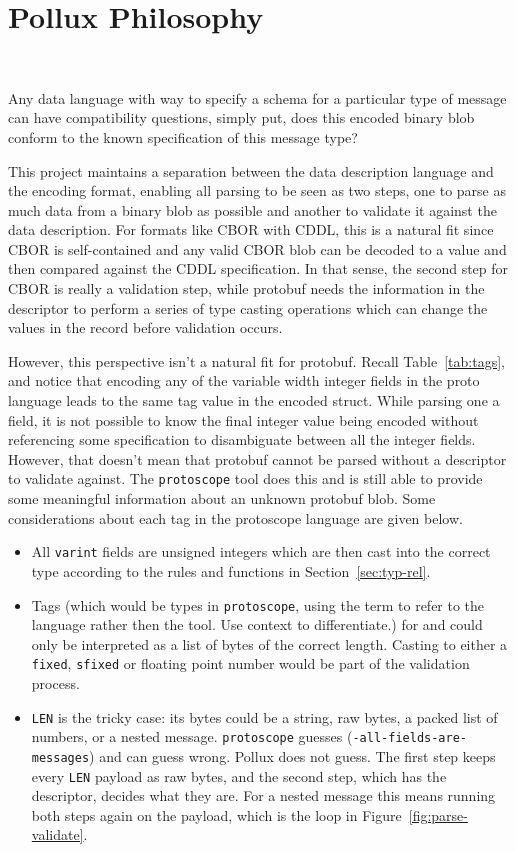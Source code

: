 \section{Pollux Philosophy}~\label{sec:philosophy}

Any data language with way to specify a schema for a particular type of message
can have compatibility questions, simply put, does this encoded binary blob
conform to the known specification of this message type?

This project maintains a separation between the data description language and
the encoding format, enabling all parsing to be seen as two steps, one to parse
as much data from a binary blob as possible and another to validate it against
the data description. For formats like CBOR with CDDL, this is a natural fit
since CBOR is self-contained and any valid CBOR blob can be decoded to a value
and then compared against the CDDL specification. In that sense, the second step
for CBOR is really a validation step, while protobuf needs the information in
the descriptor to perform a series of type casting operations which can change
the values in the record before validation occurs.

However, this perspective isn't a natural fit for protobuf. Recall
Table~\ref{tab:tags}, and notice that encoding any of the variable width integer
fields in the proto language leads to the same tag value in the encoded
struct. While parsing one a \wtvar{} field, it is not possible to know
the final integer value being encoded without referencing some specification to
disambiguate between all the integer fields. However, that doesn't mean that
protobuf cannot be parsed without a descriptor to validate against. The
\texttt{protoscope} tool does this and is still able to provide some meaningful
information about an unknown protobuf blob. Some considerations about each tag
in the protoscope language are given below.

\begin{itemize}
\item All \texttt{varint} fields are unsigned integers which are then cast into
  the correct type according to the rules and functions in
  Section~\ref{sec:typ-rel}.
\item Tags (which would be types in \texttt{protoscope}, using the term to refer
  to the language rather then the tool. Use context to differentiate.) for
  \wtis{} and \wtil{} could only be interpreted as a list of bytes of
  the correct length. Casting to either a \texttt{fixed}, \texttt{sfixed} or
  floating point number would be part of the validation process.
\item \texttt{LEN} is the tricky case: its bytes could be a string, raw bytes,
  a packed list of numbers, or a nested message. \texttt{protoscope} guesses
  (\texttt{-all-fields-are-messages}) and can guess wrong. Pollux does not
  guess. The first step keeps every \texttt{LEN} payload as raw bytes, and the
  second step, which has the descriptor, decides what they are. For a nested
  message this means running both steps again on the payload, which is the loop
  in Figure~\ref{fig:parse-validate}.
\end{itemize}

